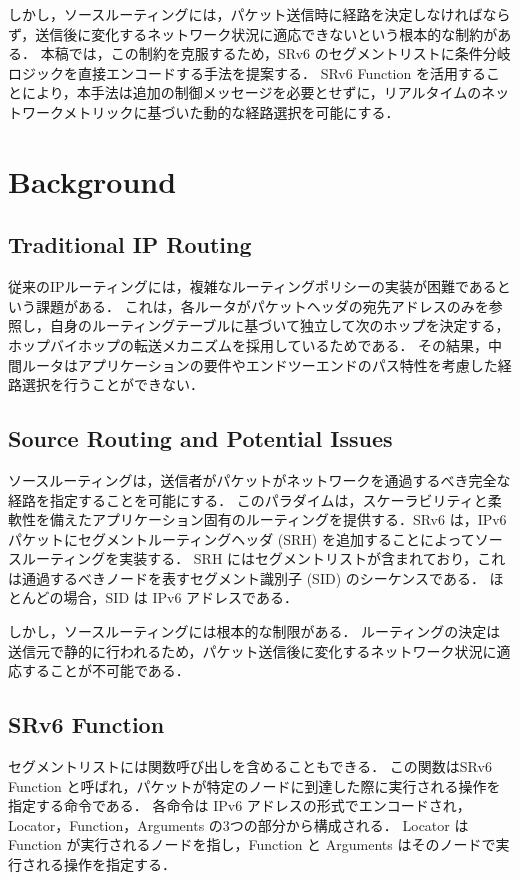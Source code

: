 \documentclass[conference]{IEEEtran}
\begin{document}
しかし，ソースルーティングには，パケット送信時に経路を決定しなければならず，送信後に変化するネットワーク状況に適応できないという根本的な制約がある．
本稿では，この制約を克服するため，SRv6 のセグメントリストに条件分岐ロジックを直接エンコードする手法を提案する．
SRv6 Function を活用することにより，本手法は追加の制御メッセージを必要とせずに，リアルタイムのネットワークメトリックに基づいた動的な経路選択を可能にする．

\section{Background}

\subsection{Traditional IP Routing}

従来のIPルーティングには，複雑なルーティングポリシーの実装が困難であるという課題がある．
これは，各ルータがパケットヘッダの宛先アドレスのみを参照し，自身のルーティングテーブルに基づいて独立して次のホップを決定する，ホップバイホップの転送メカニズムを採用しているためである．
その結果，中間ルータはアプリケーションの要件やエンドツーエンドのパス特性を考慮した経路選択を行うことができない．

\subsection{Source Routing and Potential Issues}

ソースルーティングは，送信者がパケットがネットワークを通過するべき完全な経路を指定することを可能にする．
このパラダイムは，スケーラビリティと柔軟性を備えたアプリケーション固有のルーティングを提供する．SRv6 は，IPv6 パケットにセグメントルーティングヘッダ (SRH) を追加することによってソースルーティングを実装する\cite{rfc8754}\cite{rfc9256}．
SRH にはセグメントリストが含まれており，これは通過するべきノードを表すセグメント識別子 (SID) のシーケンスである．
ほとんどの場合，SID は IPv6 アドレスである．

しかし，ソースルーティングには根本的な制限がある．
ルーティングの決定は送信元で静的に行われるため，パケット送信後に変化するネットワーク状況に適応することが不可能である．

\subsection{SRv6 Function}

セグメントリストには関数呼び出しを含めることもできる．
この関数はSRv6 Function と呼ばれ，パケットが特定のノードに到達した際に実行される操作を指定する命令である．
各命令は IPv6 アドレスの形式でエンコードされ，Locator，Function，Arguments の3つの部分から構成される．
Locator は Function が実行されるノードを指し，Function と Arguments はそのノードで実行される操作を指定する．
\end{document}
